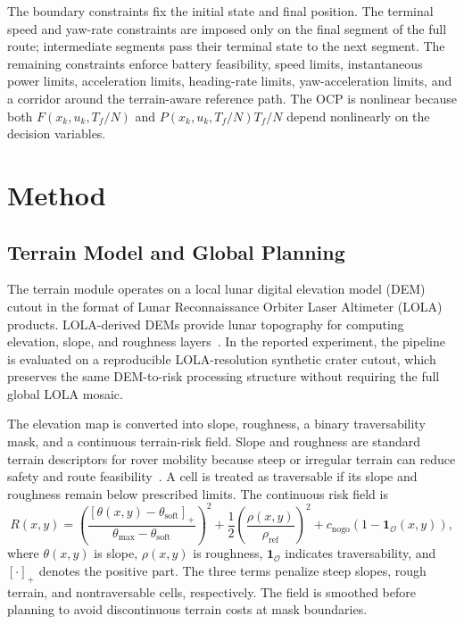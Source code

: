 \documentclass[conf]{new-aiaa}
\begin{document}
The boundary constraints fix the initial state and final position. The terminal speed and yaw-rate constraints are imposed only on the final segment of the full route; intermediate segments pass their terminal state to the next segment. The remaining constraints enforce battery feasibility, speed limits, instantaneous power limits, acceleration limits, heading-rate limits, yaw-acceleration limits, and a corridor around the terrain-aware reference path. The OCP is nonlinear because both $F(x_k,u_k,T_f/N)$ and $P(x_k,u_k,T_f/N)T_f/N$ depend nonlinearly on the decision variables.


\section{Method}

\subsection{Terrain Model and Global Planning}
The terrain module operates on a local lunar digital elevation model (DEM) cutout in the format of Lunar Reconnaissance Orbiter Laser Altimeter (LOLA) products. LOLA-derived DEMs provide lunar topography for computing elevation, slope, and roughness layers~\cite{smith2010lola,usgs_lola_dem_118m}. In the reported experiment, the pipeline is evaluated on a reproducible LOLA-resolution synthetic crater cutout, which preserves the same DEM-to-risk processing structure without requiring the full global LOLA mosaic.

The elevation map is converted into slope, roughness, a binary traversability mask, and a continuous terrain-risk field. Slope and roughness are standard terrain descriptors for rover mobility because steep or irregular terrain can reduce safety and route feasibility~\cite{nasa_lunar_mobility_drivers_2024,feng2025southpole}. A cell is treated as traversable if its slope and roughness remain below prescribed limits. The continuous risk field is
\begin{equation}
R(x,y)=
\left(
\frac{[\theta(x,y)-\theta_{\mathrm{soft}}]_+}
{\theta_{\max}-\theta_{\mathrm{soft}}}
\right)^2
+
\frac{1}{2}
\left(
\frac{\rho(x,y)}{\rho_{\mathrm{ref}}}
\right)^2
+
c_{\mathrm{nogo}}\left(1-\mathbf{1}_{\mathcal{O}}(x,y)\right),
\end{equation}
where $\theta(x,y)$ is slope, $\rho(x,y)$ is roughness, $\mathbf{1}_{\mathcal{O}}$ indicates traversability, and $[\cdot]_+$ denotes the positive part. The three terms penalize steep slopes, rough terrain, and nontraversable cells, respectively. The field is smoothed before planning to avoid discontinuous terrain costs at mask boundaries.
\end{document}
